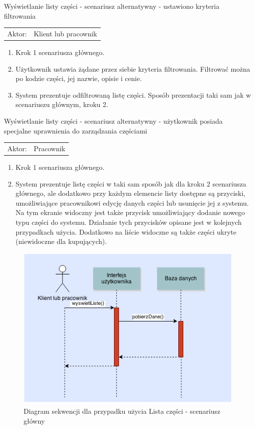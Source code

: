   \item Wyświetlanie listy części - scenariusz alternatywny - ustawiono kryteria filtrowania \\
  \begin{tabularx}{\linewidth}{ c X}
  Aktor: & Klient lub pracownik \\
  \end{tabularx}
   \begin{enumerate}
     \item Krok 1 scenariusza głównego.
     \item Użytkownik ustawia żądane przez siebie kryteria filtrowania. Filtrować można po kodzie części, jej nazwie, opisie i cenie.
     \item System prezentuje odfiltrowaną listę części. Sposób prezentacji taki sam jak w scenariuszu głównym, kroku 2.
   \end{enumerate} 
   
   \item Wyświetlanie listy części - scenariusz alternatywny - użytkownik posiada specjalne uprawnienia do zarządzania częściami \\
   \begin{tabularx}{\linewidth}{ c X}
	Aktor: & Pracownik \\
  	\end{tabularx}   
  	\begin{enumerate}
     \item Krok 1 scenariusza głównego.
  	  \item System prezentuje listę części w taki sam sposób jak dla kroku 2 scenariusza głównego, ale dodatkowo przy każdym elemencie listy dostępne są przyciski, umożliwiające pracownikowi edycję danych części lub usunięcie jej z systemu. Na tym ekranie widoczny jest także przycisk umożliwiający dodanie nowego typu części do systemu. Działanie tych przycisków opisane jest w kolejnych przypadkach użycia. Dodatkowo na liście widoczne są także części ukryte (niewidoczne dla kupujących).
  	\end{enumerate}	
  	
\begin{figure}[h!]
    \includegraphics[width=\textwidth,
    height=0.5\textheight]{graphics/UseCase/Czesci/ListaCzesciSD.png}
  \caption{Diagram sekwencji dla przypadku użycia Lista części - scenariusz główny}
\end{figure}